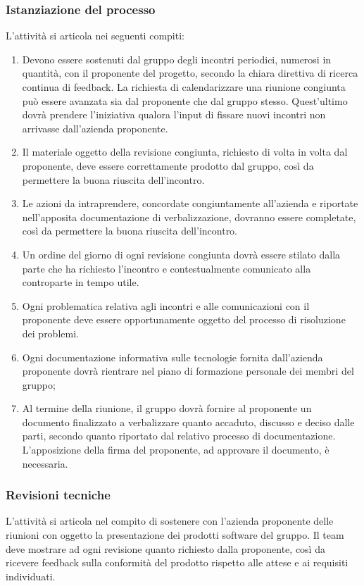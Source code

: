 \subsubsection{Istanziazione del processo}
L'attività si articola nei seguenti compiti:
\begin{enumerate}
    \item Devono essere sostenuti dal gruppo degli incontri periodici, numerosi in quantità, con il proponente del progetto, secondo la chiara direttiva di ricerca continua di feedback. La richiesta di calendarizzare una riunione congiunta può essere avanzata sia dal proponente che dal gruppo stesso. Quest'ultimo  dovrà prendere l'iniziativa qualora l'input di fissare nuovi incontri non arrivasse dall'azienda proponente.
    \item Il materiale oggetto della revisione congiunta, richiesto di volta in volta dal proponente, deve essere correttamente prodotto dal gruppo, così da permettere la buona riuscita dell'incontro.
    \item Le azioni da intraprendere, concordate congiuntamente all'azienda e riportate nell'apposita documentazione di verbalizzazione, dovranno essere completate, così da permettere la buona riuscita dell'incontro.
    \item Un ordine del giorno di ogni revisione congiunta dovrà essere stilato dalla parte che ha richiesto l'incontro e contestualmente comunicato alla controparte in tempo utile.
    \item Ogni problematica relativa agli incontri e alle comunicazioni con il proponente deve essere opportunamente oggetto del processo di risoluzione dei problemi.
    \item Ogni documentazione informativa sulle tecnologie fornita dall'azienda proponente dovrà rientrare nel piano di formazione personale dei membri del gruppo;
    \item Al termine della riunione, il gruppo dovrà fornire al proponente un documento finalizzato a verbalizzare quanto accaduto, discusso e deciso dalle parti, secondo quanto riportato dal relativo processo di documentazione. L'apposizione della firma del proponente, ad approvare il documento, è necessaria.
\end{enumerate}
\subsubsection{Revisioni tecniche}
L'attività si articola nel compito di sostenere con l'azienda proponente delle riunioni con oggetto la presentazione dei prodotti software del gruppo. Il team deve mostrare ad ogni revisione quanto richiesto dalla proponente, così da ricevere feedback sulla conformità del prodotto rispetto alle attese e ai requisiti individuati.
